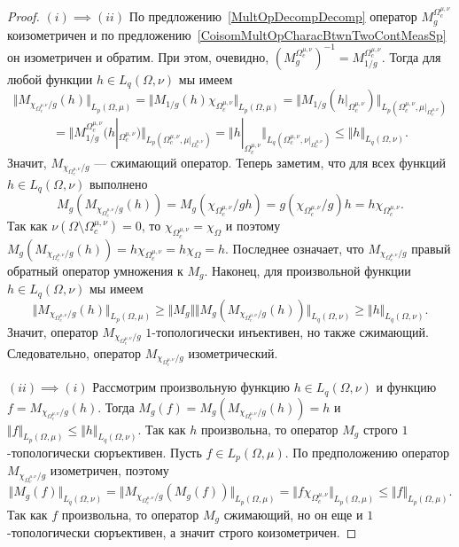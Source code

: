 \begin{proof}
$(i) \implies (ii)$ По предложению~\ref{MultOpDecompDecomp} оператор
$M_g^{\Omega_c^{\mu,\nu}}$ коизометричен и по
предложению~\ref{CoisomMultOpCharacBtwnTwoContMeasSp} он изометричен и обратим.
При этом, очевидно,
${(M_g^{\Omega_c^{\mu,\nu}})}^{-1}=M_{1/g}^{\Omega_c^{\mu,\nu}}$. 
Тогда для любой функции $h\in L_q(\Omega,\nu)$ мы имеем
$$
\Vert M_{\chi_{\Omega_c^{\mu,\nu}}/g}(h)\Vert_{L_p(\Omega,\mu)}=
\Vert M_{1/g}(h)\chi_{\Omega_c^{\mu,\nu}}\Vert_{L_p(\Omega,\mu)}=
\Vert 
    M_{1/g}(h|_{\Omega_c^{\mu,\nu}})
\Vert_{L_p(\Omega_c^{\mu,\nu},\mu|_{\Omega_c^{\mu,\nu}})}
$$
$$
=\Vert 
    M_{1/g}^{\Omega_c^{\mu,\nu}}(h|_{\Omega_c^{\mu,\nu}})
\Vert_{L_p(\Omega_c^{\mu,\nu},\mu|_{\Omega_c^{\mu,\nu}})}
=\Vert 
    h|_{\Omega_c^{\mu,\nu}}
\Vert_{L_q(\Omega_c^{\mu,\nu},\nu|_{\Omega_c^{\mu,\nu}})}
\leq\Vert h\Vert_{L_q(\Omega,\nu)}.
$$ 
Значит, $M_{\chi_{\Omega_c^{\mu,\nu}}/g}$ --- сжимающий оператор. Теперь
заметим, что для всех функций $h\in L_q(\Omega,\nu)$ выполнено
$$
M_g(M_{\chi_{\Omega_c^{\mu,\nu}}/g}(h))
=M_g(\chi_{\Omega_c^{\mu,\nu}}/g  h)
=g (\chi_{\Omega_c^{\mu,\nu}}/g) h
=h \chi_{\Omega_c^{\mu,\nu}}.
$$
Так как $\nu(\Omega\setminus\Omega_c^{\mu,\nu})=0$, то
$\chi_{\Omega_c^{\mu,\nu}}=\chi_{\Omega}$ и поэтому
$M_g(M_{\chi_{\Omega_c^{\mu,\nu}}/g}(h))
=h \chi_{\Omega_c^{\mu,\nu}}
=h\chi_{\Omega}=h$. Последнее означает, что $M_{\chi_{\Omega_c^{\mu,\nu}}/g}$
правый обратный оператор умножения к $M_g$. Наконец, для произвольной функции
$h\in L_q(\Omega,\nu)$ мы имеем
$$
\Vert M_{\chi_{\Omega_c^{\mu,\nu}}/g}(h)\Vert_{L_p(\Omega,\mu)}
\geq\Vert 
    M_g\Vert\Vert M_g(M_{\chi_{\Omega_c^{\mu,\nu}}/g}(h))
\Vert_{L_q(\Omega,\nu)}
\geq\Vert h\Vert_{L_q(\Omega,\nu)}.
$$
Значит, оператор $M_{\chi_{\Omega_c^{\mu,\nu}}/g}$ $1$-топологически инъективен,
но также сжимающий. Следовательно, оператор $M_{\chi_{\Omega_c^{\mu,\nu}}/g}$
изометрический.

$(ii) \implies (i)$ Рассмотрим произвольную функцию $h\in L_q(\Omega,\nu)$ и
функцию $f=M_{\chi_{\Omega_c^{\mu,\nu}}/g}(h)$. Тогда
$M_g(f)=M_g(M_{\chi_{\Omega_c^{\mu,\nu}}/g}(h))=h$ и $\Vert
f\Vert_{L_p(\Omega,\mu)}\leq\Vert h\Vert_{L_q(\Omega,\nu)}$. Так как $h$
произвольна, то оператор $M_g$ строго $1$-топологически сюръективен. Пусть 
$f\in L_p(\Omega,\mu)$. По предположению оператор 
$M_{\chi_{\Omega_c^{\mu,\nu}}/g}$ изометричен, поэтому 
$$
\Vert M_g(f)\Vert_{L_q(\Omega,\nu)}
=\Vert M_{\chi_{\Omega_c^{\mu,\nu}}/g}(M_g(f))\Vert_{L_p(\Omega,\mu)}
=\Vert f\chi_{\Omega_c^{\mu,\nu}}\Vert_{L_p(\Omega,\mu)}
\leq\Vert f\Vert_{L_p(\Omega,\mu)}.
$$
Так как $f$ произвольна, то оператор $M_g$ сжимающий, но он еще и
$1$-топологически сюръективен, а значит строго коизометричен.
\end{proof}

